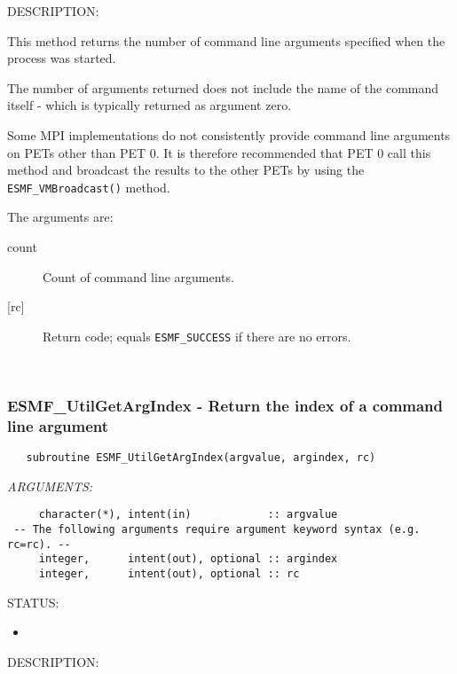 {\sf DESCRIPTION:\\ }


   This method returns the number of command line arguments specified
   when the process was started.
  
   The number of arguments returned does not include the name of the
   command itself - which is typically returned as argument zero.
  
   Some MPI implementations do not consistently provide command line
   arguments on PETs other than PET 0.  It is therefore recommended
   that PET 0 call this method and broadcast the results to the other
   PETs by using the {\tt ESMF\_VMBroadcast()} method.
  
   The arguments are:
  
   \begin{description}
   \item [count]
   Count of command line arguments.
   \item [{[rc]}]
   Return code; equals {\tt ESMF\_SUCCESS} if there are no errors.
   \end{description}
   
 
\mbox{}\hrulefill\ 
 
\subsubsection [ESMF\_UtilGetArgIndex] {ESMF\_UtilGetArgIndex - Return the index of a command line argument}


  
\begin{verbatim}   subroutine ESMF_UtilGetArgIndex(argvalue, argindex, rc)\end{verbatim}{\em ARGUMENTS:}
\begin{verbatim}     character(*), intent(in)            :: argvalue
 -- The following arguments require argument keyword syntax (e.g. rc=rc). --
     integer,      intent(out), optional :: argindex
     integer,      intent(out), optional :: rc\end{verbatim}
{\sf STATUS:}
   \begin{itemize}
   \item{}
   \end{itemize}
  
{\sf DESCRIPTION:\\ }


